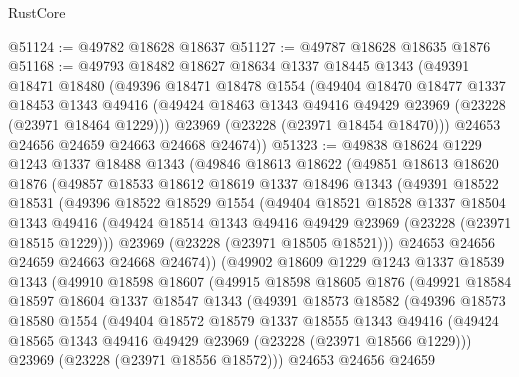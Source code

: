 \begin{lexlean}{RustCore}
\begin{coremodule}
@51124 := @49782 @18628 @18637
@51127 := @49787 @18628 @18635 @1876
@51168 := @49793
    @18482
    @18627
    @18634
    @1337
    @18445
    @1343
    (@49391
      @18471
      @18480
      (@49396
        @18471
        @18478
        @1554
        (@49404
          @18470
          @18477
          @1337
          @18453
          @1343
          @49416
          (@49424 @18463 @1343 @49416 @49429 @23969 (@23228 (@23971 @18464 @1229)))
          @23969
          (@23228 (@23971 @18454 @18470)))
        @24653
        @24656
        @24659
        @24663
        @24668
        @24674))
@51323 := @49838
    @18624
    @1229
    @1243
    @1337
    @18488
    @1343
    (@49846
      @18613
      @18622
      (@49851
        @18613
        @18620
        @1876
        (@49857
          @18533
          @18612
          @18619
          @1337
          @18496
          @1343
          (@49391
            @18522
            @18531
            (@49396
              @18522
              @18529
              @1554
              (@49404
                @18521
                @18528
                @1337
                @18504
                @1343
                @49416
                (@49424 @18514 @1343 @49416 @49429 @23969 (@23228 (@23971 @18515 @1229)))
                @23969
                (@23228 (@23971 @18505 @18521)))
              @24653
              @24656
              @24659
              @24663
              @24668
              @24674))
          (@49902
            @18609
            @1229
            @1243
            @1337
            @18539
            @1343
            (@49910
              @18598
              @18607
              (@49915
                @18598
                @18605
                @1876
                (@49921
                  @18584
                  @18597
                  @18604
                  @1337
                  @18547
                  @1343
                  (@49391
                    @18573
                    @18582
                    (@49396
                      @18573
                      @18580
                      @1554
                      (@49404
                        @18572
                        @18579
                        @1337
                        @18555
                        @1343
                        @49416
                        (@49424 @18565 @1343 @49416 @49429 @23969 (@23228 (@23971 @18566 @1229)))
                        @23969
                        (@23228 (@23971 @18556 @18572)))
                      @24653
                      @24656
                      @24659

\end{coremodule}
\end{lexlean}

